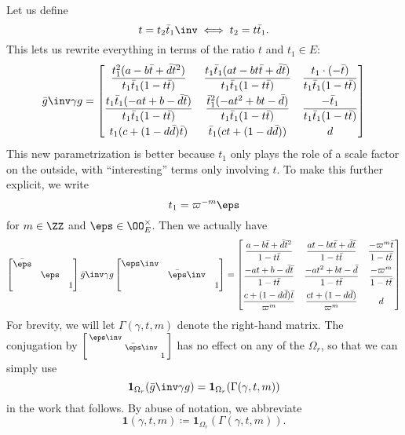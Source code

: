 Let us define \[ t = t_2 \bar t_1 \inv \iff t_2 = t \bar t_1. \]
This lets us rewrite everything in terms of the ratio $t$ and $t_1 \in E$:
\[
  \bar g \inv \gamma g
  =
  \begin{bmatrix}
    \dfrac{t_1^2(a-b\bar t+\bar d \bar t^2)}{t_1 \bar t_1(1-t \bar t)}
    & \dfrac{t_1 \bar t_1(at-bt\bar t+\bar d \bar t)}{t_1 \bar t_1(1-t \bar t)}
    & \dfrac{t_1 \cdot (-\bar t)}{t_1 \bar t_1 (1-t \bar t)} \\[2ex]
    \dfrac{t_1\bar t_1(-at+b-\bar d \bar t)}{t_1 \bar t_1(1-t \bar t)}
    & \dfrac{\bar t_1^2(-at^2+bt-\bar d)}{t_1 \bar t_1(1-t \bar t)}
    & \dfrac{-\bar t_1}{t_1 \bar t_1(1-t \bar t)} \\[2ex]
    t_1(c + (1-d\bar d)\bar t) & \bar t_1(ct + (1-d \bar d)) & d
  \end{bmatrix}
\]
This new parametrization is better because $t_1$ only plays the role of
a scale factor on the outside, with ``interesting'' terms only involving $t$.
To make this further explicit, we write
\[ t_1 = \varpi^{-m} \eps \]
for $m \in \ZZ$ and $\eps \in \OO_E^\times$.
Then we actually have
\[
  \begin{bmatrix} \bar\eps \\ & \eps \\ & & 1 \end{bmatrix}
  \bar g \inv \gamma g
  \begin{bmatrix} \eps\inv \\ & \bar\eps\inv \\ & & 1 \end{bmatrix}
  =
  \begin{bmatrix}
    \dfrac{a-b\bar t+\bar d \bar t^2}{1-t \bar t}
    & \dfrac{at-bt\bar t+\bar d \bar t}{1-t \bar t}
    & \dfrac{-\varpi^m \bar t}{1-t \bar t} \\[2ex]
    \dfrac{-at+b-\bar d \bar t}{1-t \bar t}
    & \dfrac{-at^2+bt-\bar d}{1-t \bar t}
    & \dfrac{-\varpi^m}{1-t \bar t} \\[2ex]
    \dfrac{c + (1-d\bar d)\bar t}{\varpi^m} & \dfrac{ct + (1-d \bar d)}{\varpi^m} & d
  \end{bmatrix}
\]
For brevity, we will let $\Gamma(\gamma, t, m)$ denote the right-hand matrix.
The conjugation by
$\left[ \begin{smallmatrix} \eps\inv \\ & \bar\eps\inv \\ & & 1 \end{smallmatrix} \right]$
has no effect on any of the $\Omega_r$, so that we can simply use
\[ \mathbf{1}_{\Omega_r}(\bar g \inv \gamma g) = \mathbf{1}_{\Omega_r}(\Gamma(\gamma, t, m)) \]
in the work that follows.
By abuse of notation, we abbreviate
\[ \mathbf{1}(\gamma, t, m) \coloneqq \mathbf{1}_{\Omega_r}(\Gamma(\gamma, t, m)). \]

